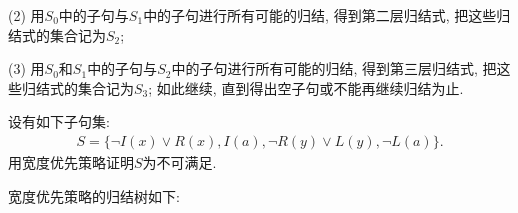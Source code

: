 (2) 用$S_0$中的子句与$S_1$中的子句进行所有可能的归结, 得到第二层归结式, 把这些归结式的集合记为$S_2$;

(3) 用$S_0$和$S_1$中的子句与$S_2$中的子句进行所有可能的归结, 得到第三层归结式, 把这些归结式的集合记为$S_3$;
如此继续, 直到得出空子句或不能再继续归结为止.
\begin{example}
设有如下子句集:
\begin{align}
    S=\{\neg I(x)\vee R(x),  I(a), \neg R(y)\vee L(y), \neg L(a)\}.
\end{align}
用宽度优先策略证明$S$为不可满足.
\end{example}

宽度优先策略的归结树如下:
